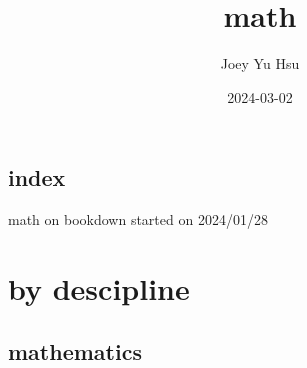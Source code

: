 \documentclass[
]{book}
\title{math}
\author{Joey Yu Hsu}
\date{2024-03-02}
\theoremstyle{definition}
\theoremstyle{definition}
\theoremstyle{definition}
\theoremstyle{definition}
\theoremstyle{remark}
\begin{document}
\maketitle

{
\hypersetup{linkcolor=}
\setcounter{tocdepth}{1}
\tableofcontents
}
\hypertarget{index}{%
\chapter*{index}\label{index}}

math on bookdown started on 2024/01/28

\hypertarget{part-by-descipline}{%
\part{by descipline}\label{part-by-descipline}}

\hypertarget{nice-label}{%
\chapter{mathematics}\label{nice-label}}
\end{document}
